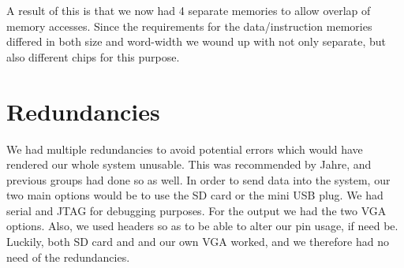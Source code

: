 A result of this is that we now had 4 separate memories to allow overlap of
memory accesses. Since the requirements for the data/instruction memories differed in both size and word-width 
we wound up with not only separate, but also different chips for this purpose.



\section{Redundancies}
We had multiple redundancies to avoid potential
errors which would have rendered our whole system unusable. This was recommended
by Jahre, and previous groups had done so as well. In order to send data into
the system, our two main options would be to use the \ac{SD} card or the mini
\ac{USB} plug. We had serial and \ac{JTAG} for debugging purposes. For the
output we had the two \ac{VGA} options. Also, we used headers so as to be able
to alter our pin usage, if need be. Luckily, both \ac{SD} card and and our
own \ac{VGA} worked, and we therefore had no need of the
redundancies. 
